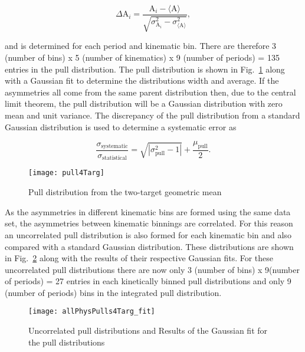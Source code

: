 \begin{equation}
  \label{eq::pull}
  \Delta\mathrm{A}_i =
  \frac{
    \mathrm{A}_i - \langle \mathrm{A} \rangle
  }{
    \sqrt{
      \sigma^2_{\mathrm{A}_i} - \sigma^2_{\langle \mathrm{A} \rangle}
    }
  },
\end{equation}

\noindent
and is determined for each period and kinematic bin.  There are therefore 3
(number of bins) x 5 (number of kinematics) x 9 (number of periods) = 135
entries in the pull distribution. The pull distribution is shown in
Fig.~\ref{fig::pull4Targ} along with a Gaussian fit to determine the
distributions width and average.  If the asymmetries all come from the same
parent distribution then, due to the central limit theorem, the pull
distribution will be a Gaussian distribution with zero mean and unit variance.
The discrepancy of the pull distribution from a standard Gaussian distribution
is used to determine a systematic error as

\begin{equation}
  \label{equ::sysErrorPull}
  \frac{\sigma_{\mathrm{systematic}}}{\sigma_{\mathrm{statistical}}} =
  \sqrt{|\sigma^2_{\mathrm{pull}} - 1|} + \frac{\mu_{\mathrm{pull}}}{2}.
\end{equation}

\begin{figure}[h!t]
  \begin{center}
    \texttt{[image: pull4Targ]}
    \caption{Pull distribution from the two-target geometric mean}
    \label{fig::pull4Targ}
  \end{center}
\end{figure}

\noindent
As the asymmetries in different kinematic bins are formed using the same data
set, the asymmetries between kinematic binnings are correlated.  For this reason
an uncorrelated pull distribution is also formed for each kinematic bin and also
compared with a standard Gaussian distribution.  These distributions are shown
in Fig.~\ref{fig::allPhysPulls4Targ_fit} along with the results of their
respective Gaussian fits.  For these uncorrelated pull distributions there are
now only 3 (number of bins) x 9(number of periods) = 27 entries in each
kinetically binned pull distributions and only 9 (number of periods) bins in the
integrated pull distribution.

\begin{figure}[h!t]
  \begin{center}
    \texttt{[image: allPhysPulls4Targ\_fit]}
    \caption{Uncorrelated pull distributions and Results of the Gaussian fit for
      the pull distributions}
    \label{fig::allPhysPulls4Targ_fit}
  \end{center}
\end{figure}


